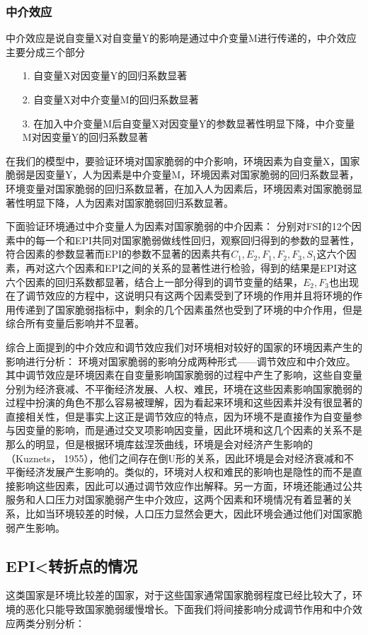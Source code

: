 {\subsubsection{中介效应}
中介效应是说自变量X对自变量Y的影响是通过中介变量M进行传递的，中介效应主要分成三个部分
\begin{itemize}
    \item[1.] 自变量X对因变量Y的回归系数显著
    \item[2.] 自变量X对中介变量M的回归系数显著
    \item[3.] 在加入中介变量M后自变量X对因变量Y的参数显著性明显下降，中介变量M对因变量Y的回归系数显著
\end{itemize}
在我们的模型中，要验证环境对国家脆弱的中介影响，环境因素为自变量X，国家脆弱是因变量Y，人为因素是中介变量M，环境因素对国家脆弱的回归系数显著，环境变量对国家脆弱的回归系数显著，在加入人为因素后，环境因素对国家脆弱显著性明显下降，人为因素对国家脆弱回归系数显著。

下面验证环境通过中介变量人为因素对国家脆弱的中介因素：
分别对FSI的12个因素中的每一个和EPI共同对国家脆弱做线性回归，观察回归得到的参数的显著性，符合因素的参数显著而EPI的参数不显著的因素共有$C_1,E_2,F_1,F_2,F_3,S_1$这六个因素，再对这六个因素和EPI之间的关系的显著性进行检验，得到的结果是EPI对这六个因素的回归系数都显著，结合上一部分得到的调节变量的结果，$E_2,F_3$也出现在了调节效应的方程中，这说明只有这两个因素受到了环境的作用并且将环境的作用传递到了国家脆弱指标中，剩余的几个因素虽然也受到了环境的中介作用，但是综合所有变量后影响并不显著。

综合上面提到的中介效应和调节效应我们对环境相对较好的国家的环境因素产生的影响进行分析：
环境对国家脆弱的影响分成两种形式——调节效应和中介效应。其中调节效应是环境因素在自变量影响国家脆弱的过程中产生了影响，这些自变量分别为经济衰减、不平衡经济发展、人权、难民，环境在这些因素影响国家脆弱的过程中扮演的角色不那么容易被理解，因为看起来环境和这些因素并没有很显著的直接相关性，但是事实上这正是调节效应的特点，因为环境不是直接作为自变量参与因变量的影响，而是通过交叉项影响因变量，因此环境和这几个因素的关系不是那么的明显，但是根据环境库兹涅茨曲线，环境是会对经济产生影响的（Kuznets， 1955），他们之间存在倒U形的关系，因此环境是会对经济衰减和不平衡经济发展产生影响的。类似的，环境对人权和难民的影响也是隐性的而不是直接影响这些因素，因此可以通过调节效应作出解释。另一方面，环境还能通过公共服务和人口压力对国家脆弱产生中介效应，这两个因素和环境情况有着显著的关系，比如当环境较差的时候，人口压力显然会更大，因此环境会通过他们对国家脆弱产生影响。


\subsection{EPI<转折点的情况}
这类国家是环境比较差的国家，对于这些国家通常国家脆弱程度已经比较大了，环境的恶化只能导致国家脆弱缓慢增长。下面我们将间接影响分成调节作用和中介效应两类分别分析：
}
